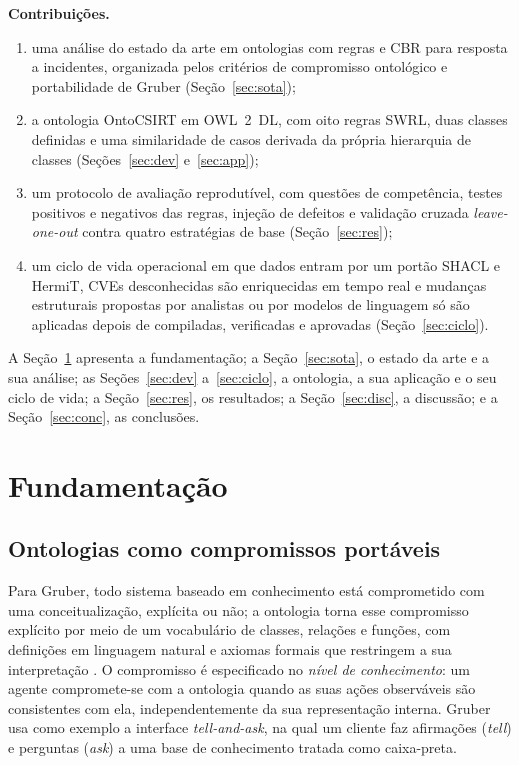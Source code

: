 \documentclass[12pt]{article}
\begin{document}
\textbf{Contribuições.}
\begin{enumerate}
\item uma análise do estado da arte em ontologias com regras e CBR para resposta a incidentes, organizada pelos critérios de compromisso ontológico e portabilidade de Gruber \cite{gruber1993} (Seção~\ref{sec:sota});
\item a ontologia OntoCSIRT em OWL~2~DL, com oito regras SWRL, duas classes definidas e uma similaridade de casos derivada da própria hierarquia de classes (Seções~\ref{sec:dev} e~\ref{sec:app});
\item um protocolo de avaliação reprodutível, com questões de competência, testes positivos e negativos das regras, injeção de defeitos e validação cruzada \emph{leave-one-out} contra quatro estratégias de base (Seção~\ref{sec:res});
\item um ciclo de vida operacional em que dados entram por um portão SHACL e HermiT, CVEs desconhecidas são enriquecidas em tempo real e mudanças estruturais propostas por analistas ou por modelos de linguagem só são aplicadas depois de compiladas, verificadas e aprovadas (Seção~\ref{sec:ciclo}).
\end{enumerate}

A Seção~\ref{sec:fund} apresenta a fundamentação; a Seção~\ref{sec:sota}, o estado da arte e a sua análise; as Seções~\ref{sec:dev} a~\ref{sec:ciclo}, a ontologia, a sua aplicação e o seu ciclo de vida; a Seção~\ref{sec:res}, os resultados; a Seção~\ref{sec:disc}, a discussão; e a Seção~\ref{sec:conc}, as conclusões.

\section{Fundamentação}
\label{sec:fund}

\subsection{Ontologias como compromissos portáveis}

Para Gruber, todo sistema baseado em conhecimento está comprometido com uma conceitualização, explícita ou não; a ontologia torna esse compromisso explícito por meio de um vocabulário de classes, relações e funções, com definições em linguagem natural e axiomas formais que restringem a sua interpretação \cite{gruber1993}. O compromisso é especificado no \emph{nível de conhecimento}: um agente compromete-se com a ontologia quando as suas ações observáveis são consistentes com ela, independentemente da sua representação interna. Gruber usa como exemplo a interface \emph{tell-and-ask}, na qual um cliente faz afirmações (\emph{tell}) e perguntas (\emph{ask}) a uma base de conhecimento tratada como caixa-preta.
\end{document}
